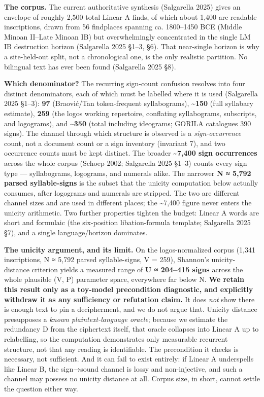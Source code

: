\documentclass[
  10pt,
]{article}
\begin{document}
\textbf{The corpus.} The current authoritative synthesis (Salgarella
2025) gives an envelope of roughly 2,500 total Linear A finds, of which
about 1,400 are readable inscriptions, drawn from 56 findplaces spanning
ca. 1800--1450 BCE (Middle Minoan II--Late Minoan IB) but overwhelmingly
concentrated in the single LM IB destruction horizon (Salgarella 2025
§1--3, §6). That near-single horizon is why a site-held-out split, not a
chronological one, is the only realistic partition. No bilingual text
has ever been found (Salgarella 2025 §8).

\textbf{Which denominator?} The recurring sign-count confusion resolves
into four distinct denominators, each of which must be labelled where it
is used (Salgarella 2025 §1--3): \textbf{97} (Braović/Tan token-frequent
syllabograms), \textbf{\textasciitilde150} (full syllabary estimate),
\textbf{259} (the logos working repertoire, conflating syllabograms,
subscripts, and logograms), and \textbf{\textasciitilde350} (total
including ideograms; GORILA catalogues 390 signs). The channel through
which structure is observed is a \emph{sign-occurrence} count, not a
document count or a sign inventory (invariant 7), and two occurrence
counts must be kept distinct. The broader \textbf{\textasciitilde7,400
sign occurrences} across the whole corpus (Schoep 2002; Salgarella 2025
§1--3) counts every sign type --- syllabograms, logograms, and numerals
alike. The narrower \textbf{N ≈ 5,792 parsed syllable-signs} is the
subset that the unicity computation below actually consumes, after
logograms and numerals are stripped. The two are different channel sizes
and are used in different places; the \textasciitilde7,400 figure never
enters the unicity arithmetic. Two further properties tighten the
budget: Linear A words are short and formulaic (the six-position
libation-formula template; Salgarella 2025 §7), and a single
language/horizon dominates.

\textbf{The unicity argument, and its limit.} On the logos-normalized
corpus (1,341 inscriptions, N ≈ 5,792 parsed syllable-signs, V = 259),
Shannon's unicity-distance criterion yields a measured range of
\textbf{U ≈ 204--415 signs} across the whole plausible (V, P) parameter
space, everywhere far below N. \textbf{We retain this result only as a
toy-model precondition diagnostic, and explicitly withdraw it as any
sufficiency or refutation claim.} It does \emph{not} show there is
enough text to pin a decipherment, and we do not argue that. Unicity
distance presupposes a \emph{known plaintext-language oracle}; because
we estimate the redundancy D from the ciphertext itself, that oracle
collapses into Linear A up to relabelling, so the computation
demonstrates only measurable recurrent structure, not that any reading
is identifiable. The precondition it checks is necessary, not
sufficient. And it can fail to exist entirely: if Linear A underspells
like Linear B, the sign→sound channel is lossy and non-injective, and
such a channel may possess no unicity distance at all. Corpus size, in
short, cannot settle the question either way.
\end{document}
